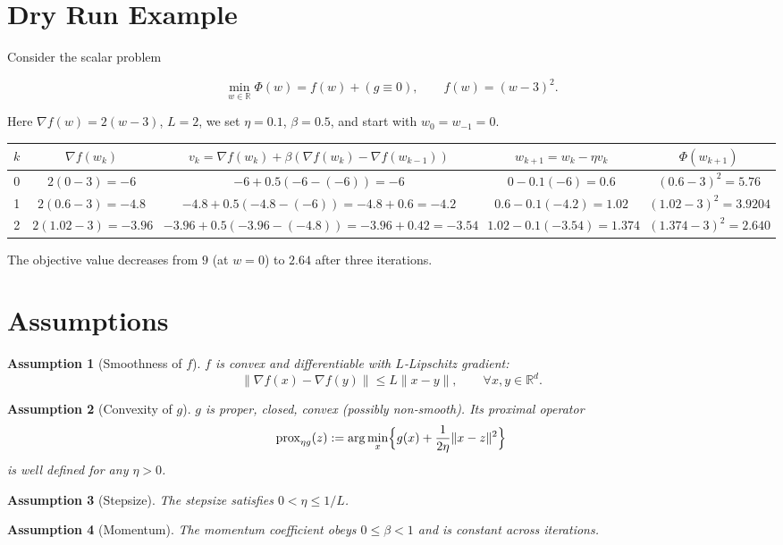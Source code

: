 \documentclass{article}
\newcommand{\prox}{\operatorname{prox}}
\newtheorem{assumption}{Assumption}
\begin{document}
\section*{Dry Run Example}
Consider the scalar problem  

\[
\min_{w\in\mathbb{R}} \Phi(w)=f(w)+(g\equiv0),\qquad 
f(w)=(w-3)^{2}.
\]

Here $\nabla f(w)=2(w-3)$, $L=2$, we set $\eta=0.1$, $\beta=0.5$, and start with $w_{0}=w_{-1}=0$.

\begin{center}
\begin{tabular}{c|c|c|c|c}
$k$ & $\nabla f(w_{k})$ & $v_{k}= \nabla f(w_{k})+\beta(\nabla f(w_{k})-\nabla f(w_{k-1}))$ & $w_{k+1}=w_{k}-\eta v_{k}$ & $\Phi(w_{k+1})$\\ \hline
0 & $2(0-3)=-6$ & $-6+\!0.5(-6-(-6))=-6$ & $0-0.1(-6)=0.6$ & $(0.6-3)^{2}=5.76$\\
1 & $2(0.6-3)=-4.8$ & $-4.8+0.5(-4.8-(-6))=-4.8+0.6=-4.2$ & $0.6-0.1(-4.2)=1.02$ & $(1.02-3)^{2}=3.9204$\\
2 & $2(1.02-3)=-3.96$ & $-3.96+0.5(-3.96-(-4.8))=-3.96+0.42=-3.54$ & $1.02-0.1(-3.54)=1.374$ & $(1.374-3)^{2}=2.640\,\!$\\
\end{tabular}
\end{center}
The objective value decreases from $9$ (at $w=0$) to $2.64$ after three iterations.

\newpage
\section*{Assumptions}
\begin{assumption}[Smoothness of $f$]\label{as:lip}
$f$ is convex and differentiable with $L$‑Lipschitz gradient:
\[
\|\nabla f(x)-\nabla f(y)\|\le L\|x-y\|,\qquad\forall x,y\in\mathbb{R}^{d}.
\]
\end{assumption}
\begin{assumption}[Convexity of $g$]\label{as:conv}
$g$ is proper, closed, convex (possibly non‑smooth). Its proximal operator
\[
\prox_{\eta g}(z):=\arg\min_{x}\Bigl\{g(x)+\frac{1}{2\eta}\|x-z\|^{2}\Bigr\}
\]
is well defined for any $\eta>0$.
\end{assumption}
\begin{assumption}[Stepsize]\label{as:step}
The stepsize satisfies $0<\eta\le 1/L$.
\end{assumption}
\begin{assumption}[Momentum]\label{as:beta}
The momentum coefficient obeys $0\le\beta<1$ and is constant across iterations.
\end{assumption}
\end{document}
